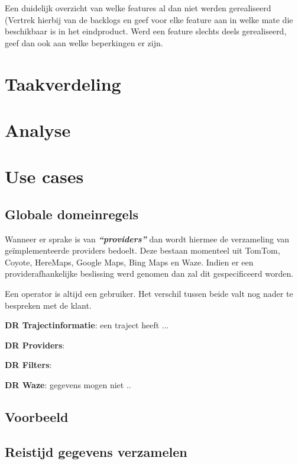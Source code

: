 \documentclass[a4paper]{article}
\begin{document}
Een duidelijk overzicht van welke features al dan
niet werden gerealiseerd (Vertrek hierbij van de backlogs en
geef voor elke feature aan in welke mate die beschikbaar is in
het eindproduct. Werd een feature slechts deels gerealiseerd,
geef dan ook aan welke beperkingen er zijn.

\section{Taakverdeling}
\label{sec:taakverdeling}

\section{Analyse}
\label{sec:analyse}

\section{Use cases}
\subsection{Globale domeinregels}

Wanneer er sprake is van \textbf{\textit{``providers''}} dan wordt hiermee de verzameling van geïmplementeerde providers bedoelt. Deze bestaan momenteel uit TomTom, Coyote, HereMaps, Google Maps, Bing Maps en Waze. Indien er een providerafhankelijke beslissing werd genomen dan zal dit gespecificeerd worden.

Een operator is altijd een gebruiker. Het verschil tussen beide valt nog nader te bespreken met de klant.

\textbf{DR Trajectinformatie}: een traject heeft ...

\textbf{DR Providers}:

\textbf{DR Filters}:

\textbf{DR Waze}: gegevens mogen niet ..

\newpage

\subsection{Voorbeeld}
\newpage

\subsection{Reistijd gegevens verzamelen}
\newpage
\end{document}
